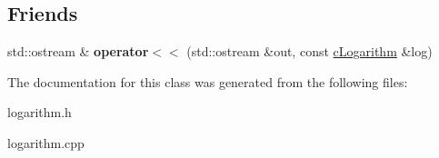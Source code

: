 \subsection*{Friends}
\begin{DoxyCompactItemize}
\item 
\hypertarget{classcLogarithm_a0bfdb69f5e7a0c18dc5a2b4327627a14}{std\-::ostream \& {\bfseries operator$<$$<$} (std\-::ostream \&out, const \hyperlink{classcLogarithm}{c\-Logarithm} \&log)}\label{classcLogarithm_a0bfdb69f5e7a0c18dc5a2b4327627a14}

\end{DoxyCompactItemize}


The documentation for this class was generated from the following files\-:\begin{DoxyCompactItemize}
\item 
logarithm.\-h\item 
logarithm.\-cpp\end{DoxyCompactItemize}
